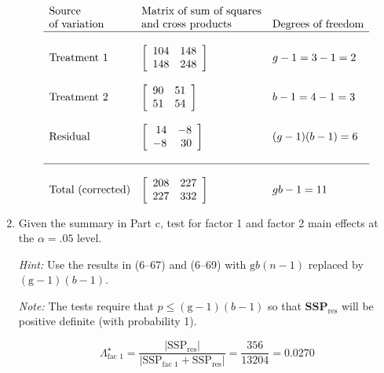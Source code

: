 \begin{enumerate}[label= (\alph*)]
\[
    \begin{array}{lll}
        \text{Source} & \text{Matrix of sum of squares} &  \\
        \text{of variation} & \text{and cross products} & \text{Degrees of freedom} \\
        \hline \\
        \text{Treatment 1} & 
        \left[
            \begin{array}{rr}
                104 & 148 \\
                148 & 248
            \end{array}
        \right] & 
        g - 1 = 3 - 1 = 2 \\ \\
        \text{Treatment 2} & 
        \left[
            \begin{array}{rr}
                90 & 51 \\
                51 & 54
            \end{array}
        \right] & 
        b - 1 = 4 - 1 = 3 \\ \\
        \text{Residual} & 
        \left[
            \begin{array}{rr}
                14 & -8 \\
                -8 & 30
            \end{array}
        \right] &
        (g - 1)(b - 1) = 6 \\ \\
        \hline \\
        \text{Total (corrected)} & 
        \left[
            \begin{array}{rr}
                208 & 227 \\
                227 & 332
            \end{array}
        \right] & 
        gb - 1 = 11
        \end{array}
\]

    \item Given the summary in Part c, test for factor 1 and factor 2 main effects at the $\alpha = .05$ level.
    
    \textit{Hint:} Use the results in (6--67) and (6--69) with $\text{g}b(n - 1)$ replaced by $(\text{g} - 1)(b - 1)$.

    \textit{Note:} The tests require that $p \leq (\text{g} - 1) (b - 1)$ so that $\textbf{SSP}_{\text{res}}$ will be positive definite
    (with probability 1).

    \[
        \Lambda_{\text{fac 1}}^{\star}
        =
        \frac{\left| \text{SSP}_{\text{res}} \right|}{\left| \text{SSP}_{\text{fac 1}} + \text{SSP}_{\text{res}} \right|}
        =
        \frac{356}{13204}
        =
        0.0270
    \]


\end{enumerate}
